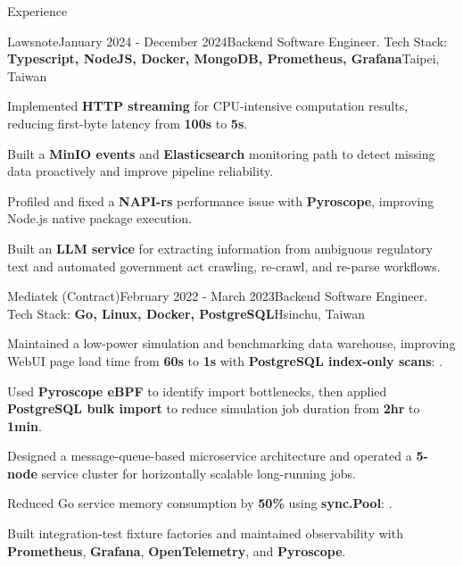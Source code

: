 \documentclass[
	11pt, %
]{resume} %
\begin{document}
\begin{rSection}{Experience}
    \begin{rSubsection}{Lawsnote}{January 2024 - December 2024}{Backend Software Engineer. Tech Stack: {\color{teal}\textbf{Typescript, NodeJS, Docker, MongoDB, Prometheus, Grafana}}}{Taipei, Taiwan}
        \item Implemented \textbf{HTTP streaming} for CPU-intensive computation results, reducing first-byte latency from \textbf{100s} to \textbf{5s}.
        \item Built a \textbf{MinIO events} and \textbf{Elasticsearch} monitoring path to detect missing data proactively and improve pipeline reliability.
        \item Profiled and fixed a \textbf{NAPI-rs} performance issue with \textbf{Pyroscope}, improving Node.js native package execution.
        \item Built an \textbf{LLM service} for extracting information from ambiguous regulatory text and automated government act crawling, re-crawl, and re-parse workflows.
    \end{rSubsection}

	\begin{rSubsection}{Mediatek (Contract)}{February 2022 - March 2023}{Backend Software Engineer. Tech Stack: {\color{teal}\textbf{Go, Linux, Docker, PostgreSQL}}}{Hsinchu, Taiwan}
            \item Maintained a low-power simulation and benchmarking data warehouse, improving WebUI page load time from \textbf{60s} to \textbf{1s} with \textbf{PostgreSQL index-only scans}: {}.
            \item Used \textbf{Pyroscope eBPF} to identify import bottlenecks, then applied \textbf{PostgreSQL bulk import} to reduce simulation job duration from \textbf{2hr} to \textbf{1min}.
            \item Designed a message-queue-based microservice architecture and operated a \textbf{5-node} service cluster for horizontally scalable long-running jobs.
            \item Reduced Go service memory consumption by \textbf{50\%} using \textbf{sync.Pool}: {}.
            \item Built integration-test fixture factories and maintained observability with \textbf{Prometheus}, \textbf{Grafana}, \textbf{OpenTelemetry}, and \textbf{Pyroscope}.
	\end{rSubsection}


\end{rSection}
\end{document}
